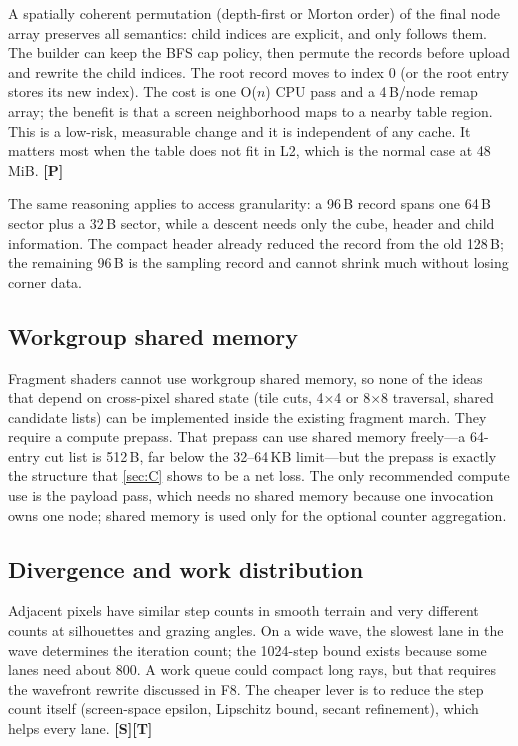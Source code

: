 \documentclass[11pt,a4paper]{article}
\newcommand{\evS}{\textsf{\textbf{\color{evS}[S]}}}
\newcommand{\evT}{\textsf{\textbf{\color{evT}[T]}}}
\newcommand{\evP}{\textsf{\textbf{\color{evP}[P]}}}
\newcommand{\code}[1]{\texttt{\detokenize{#1}}}
\theoremstyle{plain}
\theoremstyle{definition}
\theoremstyle{remark}
\begin{document}
A spatially coherent permutation (depth-first or Morton order) of the final
node array preserves all semantics: child indices are explicit, and
\code{rmFindNodeAt} only follows them. The builder can keep the BFS cap policy,
then permute the records before upload and rewrite the child indices. The root
record moves to index 0 (or the root entry stores its new index). The cost is
one O($n$) CPU pass and a 4\,B/node remap array; the benefit is that a screen
neighborhood maps to a nearby table region. This is a low-risk, measurable
change and it is independent of any cache. It matters most when the table does
not fit in L2, which is the normal case at 48\,MiB. \evP

The same reasoning applies to access granularity: a 96\,B record spans one
64\,B sector plus a 32\,B sector, while a descent needs only the cube, header
and child information. The compact header already reduced the record from the
old 128\,B; the remaining 96\,B is the sampling record and cannot shrink much
without losing corner data.

\subsection{Workgroup shared memory}

Fragment shaders cannot use workgroup shared memory, so none of the ideas that
depend on cross-pixel shared state (tile cuts, 4$\times$4 or 8$\times$8
traversal, shared candidate lists) can be implemented inside the existing
fragment march. They require a compute prepass. That prepass can use shared
memory freely---a 64-entry cut list is 512\,B, far below the 32--64\,KB
limit---but the prepass is exactly the structure that \cref{sec:C} shows to be
a net loss. The only recommended compute use is the payload pass, which needs
no shared memory because one invocation owns one node; shared memory is used
only for the optional counter aggregation.

\subsection{Divergence and work distribution}

Adjacent pixels have similar step counts in smooth terrain and very different
counts at silhouettes and grazing angles. On a wide wave, the slowest lane in
the wave determines the iteration count; the 1024-step bound exists because
some lanes need about 800. A work queue could compact long rays, but that
requires the wavefront rewrite discussed in F8. The cheaper lever is to reduce
the step count itself (screen-space epsilon, Lipschitz bound, secant
refinement), which helps every lane. \evS\evT
\end{document}
